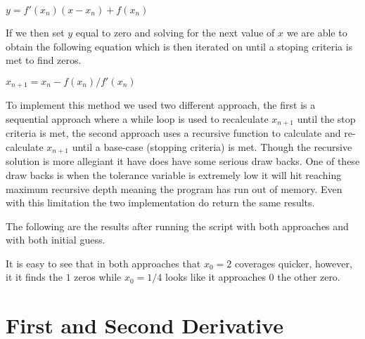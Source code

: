 \documentclass{article}
\begin{document}
	$ y = f'(x_n)(x - x_n) + f(x_n)$

If we then set $y$ equal to zero and solving for the next value of $x$ we are able to obtain the following equation which is then iterated on until a stoping criteria is met to find zeros.

	$ x_{n+1} = x_n - f(x_n) / f'(x_n) $

To implement this method we used two different approach, the first is a sequential approach where a while loop is used to recalculate $x_{n+1}$ until the stop criteria is met, the second approach uses a recursive function to calculate and re-calculate $x_{n+1}$ until a base-case (stopping criteria) is met. Though the recursive solution is more allegiant it have does have some serious draw backs. One of these draw backs is when the tolerance variable is extremely low it will hit reaching maximum recursive depth meaning the program has run out of memory. Even with this limitation the two implementation do return the same results. 

The following are the results after running the script with both approaches and with both initial guess. 



It is easy to see that in both approaches that $x_0 = 2$ coverages quicker, however, it it finds the $1$ zeros while $x_0 = 1/4$ looks like it approaches $0$ the other zero. 

\section{First and Second Derivative}
\end{document}
